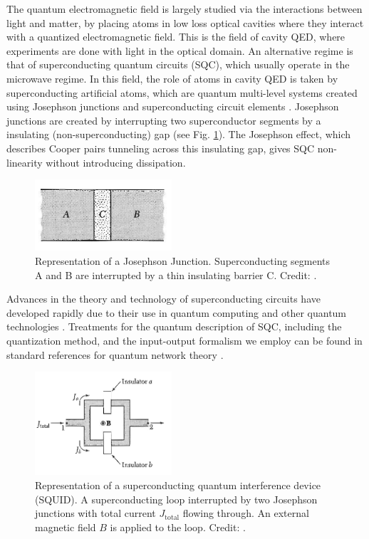 The quantum electromagnetic field is largely studied via the interactions between light and matter, by placing atoms in low loss optical cavities where they interact with a quantized electromagnetic field. This is the field of cavity QED, where experiments are done with light in the optical domain. An alternative regime is that of superconducting quantum circuits (SQC), which usually operate in the microwave regime. In this field, the role of atoms in cavity QED is taken by superconducting artificial atoms, which are quantum multi-level systems created using Josephson junctions and superconducting circuit elements \cite{Gu2017}. Josephson junctions are created by interrupting two superconductor segments by a insulating (non-superconducting) gap (see Fig. \ref{fig:Kittel_JJ}). The Josephson effect, which describes Cooper pairs tunneling across this insulating gap, gives SQC non-linearity without introducing dissipation.

\begin{figure}
    \centering
    \includegraphics[width=2in, keepaspectratio]{figures/intro/Kittel_Josephson.png}
    \caption{Representation of a Josephson Junction. Superconducting segments A and B are interrupted by a thin insulating barrier C. Credit: \protect\cite{Kittel1996_Solid_State}.}
    \label{fig:Kittel_JJ}
\end{figure}
%
Advances in the theory and technology of superconducting circuits have developed rapidly due to their use in quantum computing and other quantum technologies \cite{Krantz2019}. 
Treatments for the quantum description of SQC, including the quantization method, and the input-output formalism we employ can be found in standard references for quantum network theory \cite{Yurke1984, Vool2017}.


\begin{figure}[h]
    \centering
    \includegraphics[width=2in, keepaspectratio]{figures/intro/Kittel_SQUID.png}
    \caption{Representation of a superconducting quantum interference device (SQUID). A superconducting loop interrupted by two Josephson junctions with total current $J_{\text{total}}$ flowing through. An external magnetic field $B$ is applied to the loop. Credit: \protect\cite{Kittel1996_Solid_State}.}
    \label{fig:Kittel_SQUID}
\end{figure}

